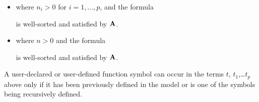 \begin{description}
\begin{itemize}
where
$n \geq 0$, $f$ has rank $\sigma_1 \cdots \sigma_n \sigma$,
$t$ is a term not containing $f$, and the formula
\smallskip

\smallskip

is well-sorted and satisfied by $\str A$.
The term $t$ is expected, although not required, to be a value 
when $f$ is a constant (i.e., when $n = 0$).
\smallskip

\item
{} 

where $n_i > 0$ for $i=1,\ldots,p$, and the formula
\smallskip

\smallskip

is well-sorted and satisfied by $\str A$.
\smallskip

\item
{} 
where $n > 0$ and the formula 
\smallskip

\smallskip

is well-sorted and satisfied by $\str A$.

\end{itemize}

A user-declared or user-defined function symbol can occur in the terms $t$, $t_1$,\dots $t_p$
above only if it has been previously defined in the model or is one of the symbols
being recursively defined.


\end{description}
